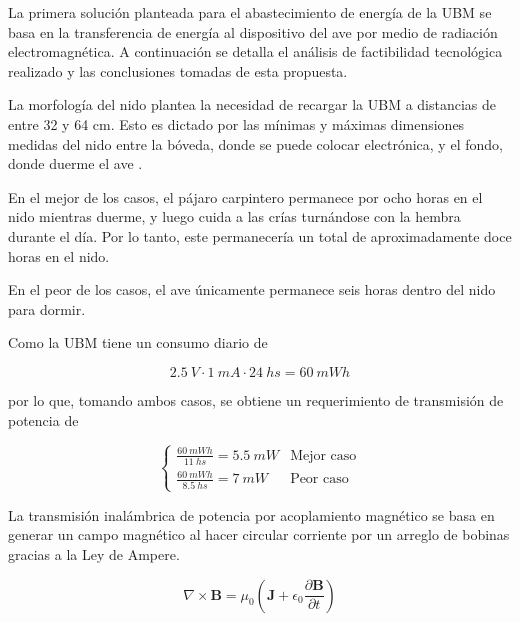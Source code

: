 La primera solución planteada para el abastecimiento de energía de la UBM se basa en la transferencia de energía al dispositivo del ave por medio de radiación electromagnética. A continuación se detalla el análisis de factibilidad tecnológica realizado y las conclusiones tomadas de esta propuesta.


La morfología del nido plantea la necesidad de recargar la UBM a distancias de entre 32 y 64 cm. Esto es dictado por las mínimas y máximas dimensiones medidas del nido entre la bóveda, donde se puede colocar electrónica, y el fondo, donde duerme el ave \cite{ref:PaperValeriaOjeda}.

En el mejor de los casos, el pájaro carpintero permanece por ocho horas en el nido mientras duerme, y luego cuida a las crías turnándose con la hembra durante el día. Por lo tanto, este permanecería un total de aproximadamente doce horas en el nido.

En el peor de los casos, el ave únicamente permanece seis horas dentro del nido para dormir.

Como la UBM tiene un consumo diario de

\begin{equation}
2.5 \ V \cdot 1 \ mA \cdot 24 \ hs = 60 \ mWh
\end{equation}

por lo que, tomando ambos casos, se obtiene un requerimiento de transmisión de potencia de

\begin{equation}
	\begin{cases} 
       \frac{60 \ mWh}{11 \ hs}= 5.5 \ mW & \text{Mejor caso} \\
       \frac{60 \ mWh}{8.5 \ hs} = 7 \ mW & \text{Peor caso}    
    \end{cases}
\end{equation}


La transmisión inalámbrica de potencia por acoplamiento magnético se basa en generar un campo magnético al hacer circular corriente por un arreglo de bobinas gracias a la Ley de Ampere.

\begin{equation}
\nabla \times \mathbf{B} = \mu_0\left( \mathbf{J} + \epsilon_0 \frac{\partial \mathbf{B}}{\partial t} \right)
\end{equation}

